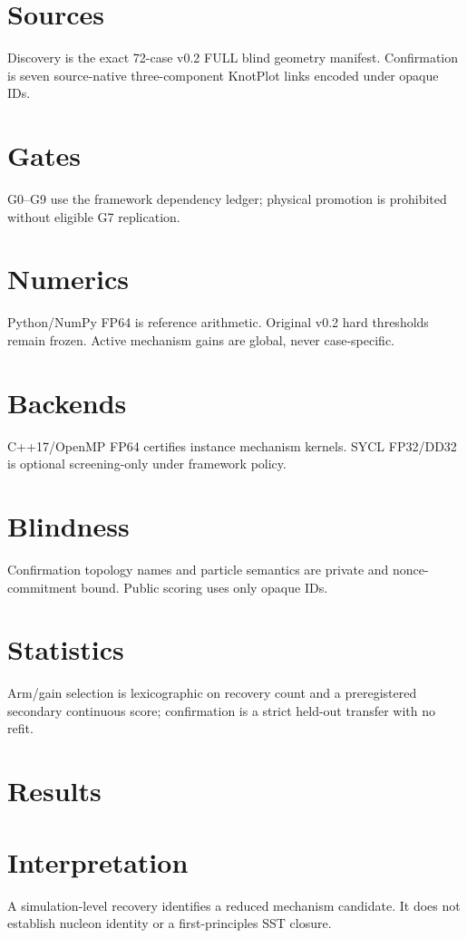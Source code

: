 \documentclass[11pt]{article}
\begin{document}
\section{Sources} Discovery is the exact 72-case v0.2 FULL blind geometry manifest. Confirmation is seven source-native three-component KnotPlot links encoded under opaque IDs.
\section{Gates} G0--G9 use the framework dependency ledger; physical promotion is prohibited without eligible G7 replication.
\section{Numerics} Python/NumPy FP64 is reference arithmetic. Original v0.2 hard thresholds remain frozen. Active mechanism gains are global, never case-specific.
\section{Backends} C++17/OpenMP FP64 certifies instance mechanism kernels. SYCL FP32/DD32 is optional screening-only under framework policy.
\section{Blindness} Confirmation topology names and particle semantics are private and nonce-commitment bound. Public scoring uses only opaque IDs.
\section{Statistics} Arm/gain selection is lexicographic on recovery count and a preregistered secondary continuous score; confirmation is a strict held-out transfer with no refit.
\section{Results}
\section{Interpretation} A simulation-level recovery identifies a reduced mechanism candidate. It does not establish nucleon identity or a first-principles SST closure.
\end{document}
